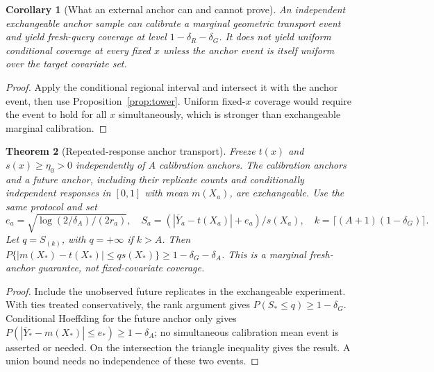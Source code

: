 \documentclass[11pt,a4paper]{article}
\numberwithin{equation}{section}
\newtheorem{theorem}{Theorem}[section]
\newtheorem{corollary}[theorem]{Corollary}
\theoremstyle{definition}\newtheorem{definition}[theorem]{Definition}
\theoremstyle{remark}\newtheorem{remark}[theorem]{Remark}
\begin{document}
\begin{corollary}[What an external anchor can and cannot prove]\label{cor:anchor}
An independent exchangeable anchor sample can calibrate a marginal geometric transport event and yield fresh-query coverage at level $1-\delta_R-\delta_G$. It does not yield uniform conditional coverage at every fixed $x$ unless the anchor event is itself uniform over the target covariate set.
\end{corollary}
\begin{proof}
Apply the conditional regional interval and intersect it with the anchor event, then use Proposition~\ref{prop:tower}. Uniform fixed-$x$ coverage would require the event to hold for all $x$ simultaneously, which is stronger than exchangeable marginal calibration.
\end{proof}

\begin{theorem}[Repeated-response anchor transport]\label{thm:anchor}
Freeze $t(x)$ and $s(x)\ge\eta_0>0$ independently of $A$ calibration anchors.
The calibration anchors and a future anchor, including their replicate counts
and conditionally independent responses in $[0,1]$ with mean $m(X_a)$, are
exchangeable. Use the same protocol and set
\[
 e_a=\sqrt{\log(2/\delta_A)/(2r_a)},\quad
 S_a=(|\overline Y_a-t(X_a)|+e_a)/s(X_a),\quad
 k=\lceil(A+1)(1-\delta_G)\rceil.
\]
Let $q=S_{(k)}$, with $q=+\infty$ if $k>A$. Then
$P\{|m(X_*)-t(X_*)|\le q s(X_*)\}\ge1-\delta_G-\delta_A$.
This is a marginal fresh-anchor guarantee, not fixed-covariate coverage.
\end{theorem}
\begin{proof}
Include the unobserved future replicates in the exchangeable experiment. With
ties treated conservatively, the rank argument gives $P(S_*\le q)\ge1-\delta_G$.
Conditional Hoeffding for the future anchor only gives
$P(|\overline Y_*-m(X_*)|\le e_*)\ge1-\delta_A$; no simultaneous calibration
mean event is asserted or needed. On the intersection the triangle inequality
gives the result. A union bound needs no independence of these two events.
\end{proof}
\end{document}
